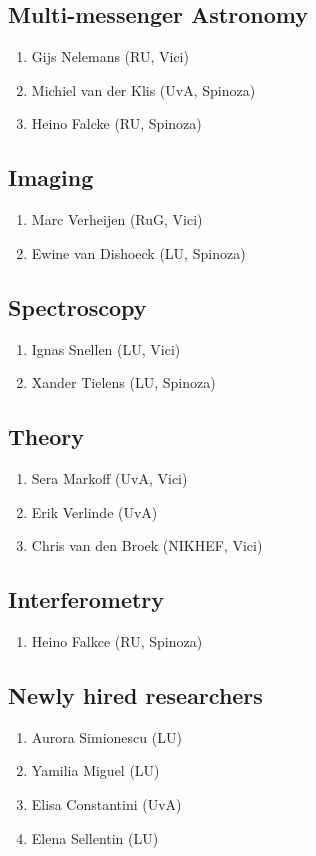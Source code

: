 \documentclass{article}
\begin{document}
\subsection{Multi-messenger Astronomy}
\begin{enumerate}
    \item Gijs Nelemans (RU, Vici)
    \item Michiel van der Klis (UvA, Spinoza)
    \item Heino Falcke (RU, Spinoza)
\end{enumerate}

\subsection{Imaging}
\begin{enumerate}
    \item Marc Verheijen (RuG, Vici)
    \item Ewine van Dishoeck (LU, Spinoza)
\end{enumerate}

\subsection{Spectroscopy}
\begin{enumerate}
    \item Ignas Snellen (LU, Vici)
    \item Xander Tielens (LU, Spinoza)
\end{enumerate}

\subsection{Theory}
\begin{enumerate}
    \item Sera Markoff (UvA, Vici)
    \item Erik Verlinde (UvA)
    \item Chris van den Broek (NIKHEF, Vici)
\end{enumerate}

\subsection{Interferometry}
\begin{enumerate}
    \item Heino Falkce (RU, Spinoza)
\end{enumerate}

\subsection{Newly hired researchers}
\begin{enumerate}
    \item Aurora Simionescu (LU)
    \item Yamilia Miguel (LU)
    \item Elisa Constantini (UvA)
    \item Elena Sellentin (LU)
\end{enumerate}
\end{document}

